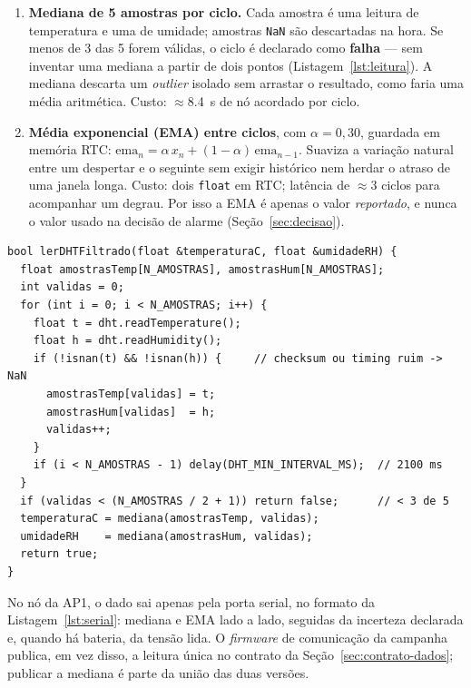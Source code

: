 \begin{enumerate}
  \item \textbf{Mediana de 5 amostras por ciclo.} Cada amostra é uma
    leitura de temperatura e uma de umidade; amostras \texttt{NaN} são
    descartadas na hora. Se menos de 3 das 5 forem válidas, o ciclo é
    declarado como \textbf{falha} --- sem inventar uma mediana a
    partir de dois pontos (Listagem~\ref{lst:leitura}). A mediana
    descarta um \emph{outlier} isolado sem arrastar o resultado, como
    faria uma média aritmética. Custo: $\approx$\SI{8.4}{\second} de
    nó acordado por ciclo.
  \item \textbf{Média exponencial (EMA) entre ciclos}, com
    $\alpha = 0{,}30$, guardada em memória RTC:
    $\text{ema}_{n} = \alpha\,x_n + (1-\alpha)\,\text{ema}_{n-1}$.
    Suaviza a variação natural entre um despertar e o seguinte sem
    exigir histórico nem herdar o atraso de uma janela longa. Custo:
    dois \texttt{float} em RTC; latência de $\approx$3 ciclos para
    acompanhar um degrau. Por isso a EMA é apenas o valor
    \emph{reportado}, e nunca o valor usado na decisão de alarme
    (Seção~\ref{sec:decisao}).
\end{enumerate}

\begin{lstlisting}[style=arduino,
  caption={Captação do DHT22: 5 amostras, descarte de \texttt{NaN}, maioria obrigatória, mediana},
  label={lst:leitura}]
bool lerDHTFiltrado(float &temperaturaC, float &umidadeRH) {
  float amostrasTemp[N_AMOSTRAS], amostrasHum[N_AMOSTRAS];
  int validas = 0;
  for (int i = 0; i < N_AMOSTRAS; i++) {
    float t = dht.readTemperature();
    float h = dht.readHumidity();
    if (!isnan(t) && !isnan(h)) {     // checksum ou timing ruim -> NaN
      amostrasTemp[validas] = t;
      amostrasHum[validas]  = h;
      validas++;
    }
    if (i < N_AMOSTRAS - 1) delay(DHT_MIN_INTERVAL_MS);  // 2100 ms
  }
  if (validas < (N_AMOSTRAS / 2 + 1)) return false;      // < 3 de 5
  temperaturaC = mediana(amostrasTemp, validas);
  umidadeRH    = mediana(amostrasHum, validas);
  return true;
}
\end{lstlisting}

No nó da AP1, o dado sai apenas pela porta serial, no formato da
Listagem~\ref{lst:serial}: mediana e EMA lado a lado, seguidas da
incerteza declarada e, quando há bateria, da tensão lida. O
\emph{firmware} de comunicação da campanha publica, em vez disso, a
leitura única no contrato da Seção~\ref{sec:contrato-dados}; publicar a
mediana é parte da união das duas versões.

